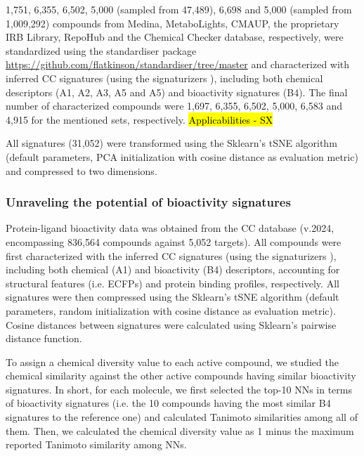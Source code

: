 1,751, 6,355, 6,502, 5,000 (sampled from 47,489), 6,698 and 5,000 (sampled from 1,009,292) compounds from Medina, MetaboLights, CMAUP, the proprietary IRB Library, RepoHub and the Chemical Checker database, respectively, were standardized using the standardiser package \hyperlink{https://github.com/flatkinson/standardiser/tree/master}{https://github.com/flatkinson/standardiser/tree/master} and characterized with inferred CC signatures (using the signaturizers \cite{bertoni_bioactivity_2021}), including both chemical descriptors (A1, A2, A3, A5 and A5) and bioactivity signatures (B4). The final number of characterized compounds were 1,697, 6,355, 6,502, 5,000, 6,583 and 4,915 for the mentioned sets, respectively. \hl{Applicabilities - SX}

All signatures (31,052) were transformed using the Sklearn’s \cite{pedregosa_scikit-learn_2011} tSNE algorithm (default parameters, PCA initialization with cosine distance as evaluation metric) and compressed to two dimensions.

\subsubsection{Unraveling the potential of bioactivity signatures}

Protein-ligand bioactivity data was obtained from the CC database (v.2024, encompassing 836,564 compounds against 5,052 targets). All compounds were first characterized with the inferred CC signatures (using the signaturizers \cite{bertoni_bioactivity_2021}), including both chemical (A1) and bioactivity (B4) descriptors, accounting for structural features (i.e. ECFPs) and protein binding profiles, respectively. All signatures were then compressed using the Sklearn’s \cite{pedregosa_scikit-learn_2011} tSNE algorithm (default parameters, random initialization with cosine distance as evaluation metric). Cosine distances between signatures were calculated using Sklearn’s pairwise distance function. 

To assign a chemical diversity value to each active compound, we studied the chemical similarity against the other active compounds having similar bioactivity signatures. In short, for each molecule, we first selected the top-10 NNs in terms of bioactivity signatures (i.e. the 10 compounds having the most similar B4 signatures to the reference one) and calculated Tanimoto similarities among all of them. Then, we calculated the chemical diversity value as 1 minus the maximum reported Tanimoto similarity among NNs. 